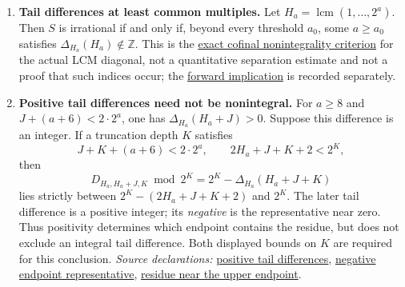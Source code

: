 \documentclass[11pt]{article}
\theoremstyle{plain}
\theoremstyle{definition}
\theoremstyle{remark}
\newcommand{\commit}{99f4bf47422abbd8757cbb22b50ba079d764d3a7}
\newcommand{\repobase}{https://github.com/wcook04/plectis-erdos/blob/\commit}
\newcommand{\Z}{\mathbb{Z}}
\newcommand{\lcm}{\operatorname{lcm}}
\newcommand{\mword}[4]{\href{\repobase/#1\#L#2}{#4}}
\begin{document}
\begin{enumerate}
\item\label{res:actualorbit}
\textbf{Tail differences at least common multiples.}  Let
$H_a=\lcm(1,\ldots,2^a)$. Then $S$ is irrational if and only if,
beyond every threshold $a_0$, some $a\ge a_0$ satisfies
$\Delta_{H_a}(H_a)\notin\Z$.  This is the
\mword{Erdos249257/TotientActualLcmOrbitNonintegrality.lean}{37}{irrational_totientSeries_iff_actualLcmOrbitNonintegralitySupply}{exact cofinal nonintegrality criterion}
for the actual LCM diagonal, not a quantitative
separation estimate and not a proof that such indices occur; the
\mword{Erdos249257/TotientActualLcmOrbitNonintegrality.lean}{53}{irrational_totientSeries_of_actualLcmOrbitNonintegralitySupply}{forward implication}
is recorded separately.

\item\label{res:actualsign}
\textbf{Positive tail differences need not be nonintegral.} For $a\ge8$ and
$J+(a+6)<2\cdot2^a$, one has $\Delta_{H_a}(H_a+J)>0$.
Suppose this difference is an integer. If a truncation depth $K$ satisfies
\[
 J+K+(a+6)<2\cdot2^a,
 \qquad 2H_a+J+K+2<2^K,
\]
then
\[
 D_{H_a,H_a+J,K}\bmod2^K
   =2^K-\Delta_{H_a}(H_a+J+K)
\]
lies strictly between $2^K-(2H_a+J+K+2)$ and $2^K$.
The later tail difference is a positive integer; its \emph{negative} is
the representative near zero. Thus positivity determines which endpoint
contains the residue, but does not exclude an integral tail difference.
Both displayed bounds on $K$ are required for this conclusion.
{\footnotesize\emph{Source declarations:}
\mword{Erdos249257/TotientActualLcmOrbitSign.lean}{39}{actualLcmTailDiff_shift_pos}{positive tail differences},
\mword{Erdos249257/TotientActualLcmOrbitSign.lean}{172}{actualLcm_trueEndpointSurvivor_neg}{negative endpoint representative},
\mword{Erdos249257/TotientActualLcmOrbitSign.lean}{211}{actualLcm_integral_forces_topEdgeResidue}{residue near the upper endpoint}.}


\end{enumerate}
\end{document}

